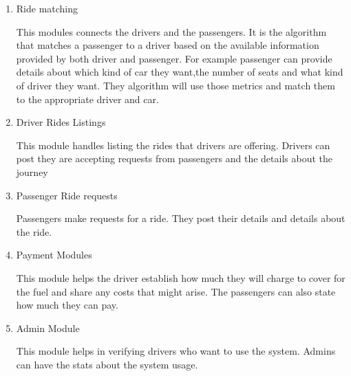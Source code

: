 
\begin{enumerate}
      \item Ride matching

            This modules connects the drivers and the passengers. It is the algorithm that matches a passenger to a driver based on the available information provided by both driver and passenger. For example passenger can provide details about which kind of car they want,the number of seats and what kind of driver they want. They algorithm will use those metrics and match them to the appropriate driver and car.

      \item Driver Rides Listings

            This module handles listing the rides that drivers are offering. Drivers can post they are accepting requests from passengers and the details about the journey

      \item Passenger Ride requests

            Passengers make requests for a ride. They post their details and details about the ride.

      \item Payment Modules

            This module helps the driver establish how much they will charge to cover for the fuel and share any costs that might arise. The passengers can also state how much they can pay.

      \item Admin Module

            This module helps in verifying drivers who want to use the system. Admins can have the stats about the system usage.
\end{enumerate}